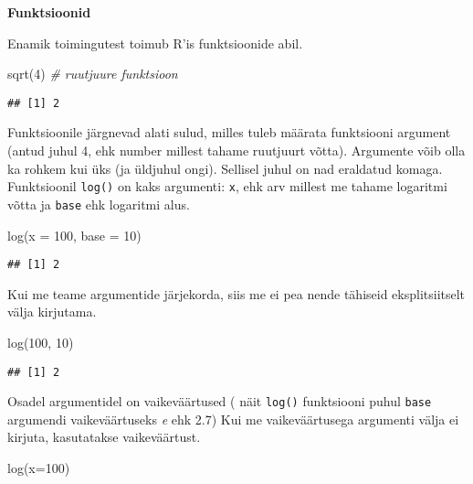 \documentclass[
]{book}
\newenvironment{Shaded}{\begin{snugshade}}{\end{snugshade}}
\newcommand{\AttributeTok}[1]{\textcolor[rgb]{0.77,0.63,0.00}{#1}}
\newcommand{\CommentTok}[1]{\textcolor[rgb]{0.56,0.35,0.01}{\textit{#1}}}
\newcommand{\DecValTok}[1]{\textcolor[rgb]{0.00,0.00,0.81}{#1}}
\newcommand{\FunctionTok}[1]{\textcolor[rgb]{0.00,0.00,0.00}{#1}}
\newcommand{\NormalTok}[1]{#1}
\begin{document}
\textbf{Funktsioonid}

Enamik toimingutest toimub R'is funktsioonide abil.

\begin{Shaded}
\begin{Highlighting}[]
\FunctionTok{sqrt}\NormalTok{(}\DecValTok{4}\NormalTok{) }\CommentTok{\# ruutjuure funktsioon}
\end{Highlighting}
\end{Shaded}

\begin{verbatim}
## [1] 2
\end{verbatim}

Funktsioonile järgnevad alati sulud, milles tuleb määrata funktsiooni argument (antud juhul 4, ehk number millest tahame ruutjuurt võtta). Argumente võib olla ka rohkem kui üks (ja üldjuhul ongi). Sellisel juhul on nad eraldatud komaga. Funktsioonil \texttt{log()} on kaks argumenti: \texttt{x}, ehk arv millest me tahame logaritmi võtta ja \texttt{base} ehk logaritmi alus.

\begin{Shaded}
\begin{Highlighting}[]
\FunctionTok{log}\NormalTok{(}\AttributeTok{x =} \DecValTok{100}\NormalTok{, }\AttributeTok{base =} \DecValTok{10}\NormalTok{)}
\end{Highlighting}
\end{Shaded}

\begin{verbatim}
## [1] 2
\end{verbatim}

Kui me teame argumentide järjekorda, siis me ei pea nende tähiseid eksplitsiitselt välja kirjutama.

\begin{Shaded}
\begin{Highlighting}[]
\FunctionTok{log}\NormalTok{(}\DecValTok{100}\NormalTok{, }\DecValTok{10}\NormalTok{)}
\end{Highlighting}
\end{Shaded}

\begin{verbatim}
## [1] 2
\end{verbatim}

Osadel argumentidel on vaikeväärtused ( näit \texttt{log()} funktsiooni puhul \texttt{base} argumendi vaikeväärtuseks \emph{e} ehk 2.7) Kui me vaikeväärtusega argumenti välja ei kirjuta, kasutatakse vaikeväärtust.

\begin{Shaded}
\begin{Highlighting}[]
\FunctionTok{log}\NormalTok{(}\AttributeTok{x=}\DecValTok{100}\NormalTok{)}
\end{Highlighting}
\end{Shaded}
\end{document}
